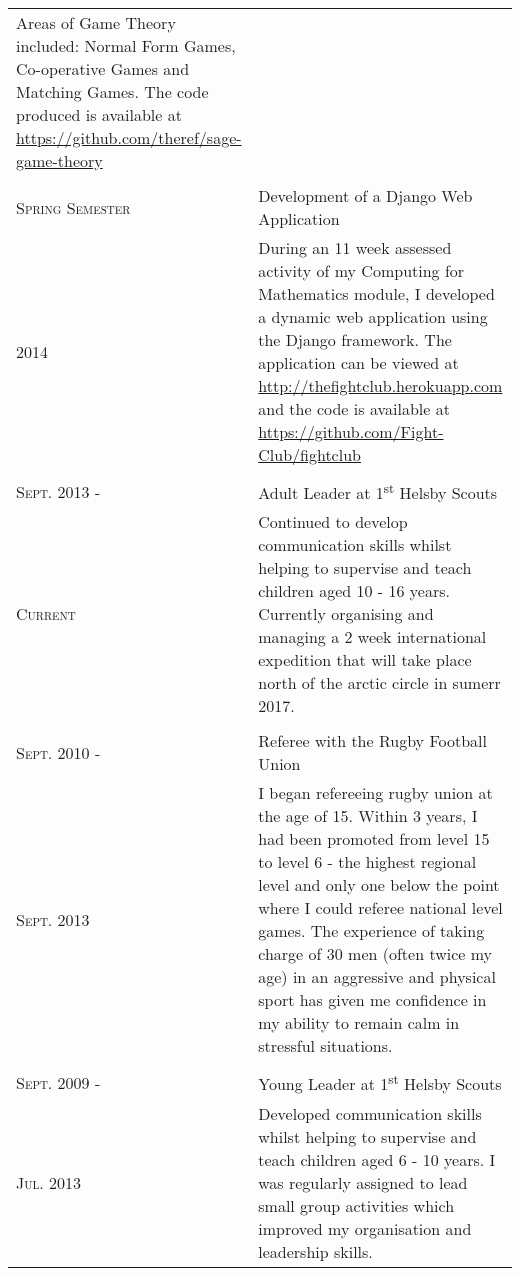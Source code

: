 \documentclass[a4paper]{article}
\begin{document}
\begin{tabularx}{\textwidth}{lX}
{Areas of Game Theory included: Normal Form Games, Co-operative Games and Matching Games. The code produced is available at \url{https://github.com/theref/sage-game-theory}}
\\
\\
\textsc{Spring Semester} & Development of a Django Web Application\\
\textsc{2014} & \footnotesize{During an 11 week assessed activity of my Computing for Mathematics module, I developed a dynamic web application using the Django framework. The application can be viewed at \url{http://thefightclub.herokuapp.com} and the code is available at \url{https://github.com/Fight-Club/fightclub}}
\\
\\
\textsc{Sept. 2013 -} & Adult Leader at 1\textsuperscript{st} Helsby Scouts\\
\textsc{Current} & \footnotesize{Continued to develop communication skills whilst helping to supervise and teach children aged 10 - 16 years.
Currently organising and managing a 2 week international expedition that will take place north of the arctic circle in sumerr 2017.}
\\
\\
\textsc{Sept. 2010 -} & Referee with the Rugby Football Union \\
\textsc{Sept. 2013} & \footnotesize{I began refereeing rugby union at the age of 15. Within 3 years, I had been promoted from level 15 to level 6 - the highest regional level and only one below the point where I could referee national level games.
The experience of taking charge of 30 men (often twice my age) in an aggressive and physical sport has given me confidence in my ability to remain calm in stressful situations.}
\\
\\
\textsc{Sept. 2009 -} & Young Leader at 1\textsuperscript{st} Helsby Scouts\\
\textsc{Jul. 2013} & \footnotesize{Developed communication skills whilst helping to supervise and teach children aged 6 - 10 years.
I was regularly assigned to lead small group activities which improved my organisation and leadership skills.}\\

\end{tabularx}
\end{document}
